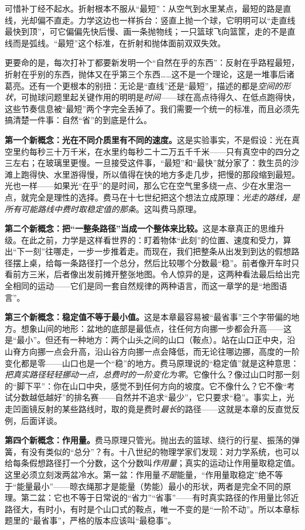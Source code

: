 可惜补丁经不起水。折射根本不服从“最短”：从空气到水里某点，最短的路是直线，光却偏不直走。力学这边也一样拆台：竖直上抛一个球，它明明可以“走直线最快到顶”，可它偏偏先快后慢、画一条抛物线；一只篮球飞向篮筐，走的不是直线而是弧线。“最短”这个标准，在折射和抛体面前双双失效。

更要命的是，每次打补丁都要新发明一个“自然在乎的东西”：反射在乎路程最短，折射在乎别的东西，抛体又在乎第三个东西……这不是一个理论，这是一堆事后诸葛亮。还有一个更根本的别扭：无论是“直线”还是“最短”，描述的都是\emph{空间的形状}，可抛球问题里起关键作用的明明是\emph{时间}——球在高点待得久、在低点跑得快，这些节奏信息被“最短”两个字完全丢掉了。我们需要一个统一的标准，而且必须先搞清楚一件事：自然“省”的到底是什么。


\begin{mainline}
\textbf{第一个新概念：光在不同介质里有不同的速度。}这是实验事实，不是假设：光在真空里约每秒三十万千米，在水里约每秒二十二万五千千米——只有真空中的四分之三左右；在玻璃里更慢。一旦接受这件事，“最短”和“最快”就分家了：救生员的沙滩上跑得快、水里游得慢，所以值得在快的地方多走几步，把慢的那段缩到最短。光也一样——如果光“在乎”的是时间，那么它在空气里多绕一点、少在水里泡一点，就完全是理性的选择。费马在十七世纪把这个想法立成原理：\emph{光走的路线，是所有可能路线中费时取稳定值的那条}。这叫费马原理。

\textbf{第二个新概念：把“一整条路径”当成一个整体来比较。}这是本章真正的思维升级。在此之前，力学是这样看世界的：盯着物体“此刻”的位置、速度和受力，算出“下一刻”往哪走，一步一步推着走。而现在，我们把整条从出发到到达的假想路径摆上桌，给每一条路径打一个总分，然后比较哪个分数最“稳”。前者像开车时只看前方三米，后者像出发前摊开整张地图。令人惊异的是，这两种看法最后给出完全相同的运动——它们是同一套自然规律的两种语言，而这一章学的是“地图语言”。

\textbf{第三个新概念：稳定值不等于最小值。}这是本章最容易被“最省事”三个字带偏的地方。想象山间的地形：盆地的底部是最低点，往任何方向挪一步都会升高——这是“最小”。但还有一种地方：两个山头之间的山口（鞍点）。站在山口正中央，沿山脊方向挪一点会升高，沿山谷方向挪一点会降低，而无论往哪边挪，高度的一阶变化都是零——山口也是一个“稳”的地方。费马原理说的“稳定值”就是这种意思：\emph{把真实路径轻轻挪动一点，总费时的一阶变化为零}。它像什么？像过山口时那一刻的“脚下平”：你在山口中央，感觉不到任何方向的坡度。它不像什么？它不像“考试分数越低越好”的排名赛——自然并不追求“最少”，它只要求“稳”。事实上，光走凹面镜反射的某些路线时，取的竟是费时\emph{最长}的路径——这就是本章的反直觉反例，后面详谈。

\textbf{第四个新概念：作用量。}费马原理只管光。抛出去的篮球、绕行的行星、振荡的弹簧，有没有类似的“总分”？有。十八世纪的物理学家们发现：对力学系统，也可以给每条假想路径打一个分数，这个分数叫\emph{作用量}；真实的运动让作用量取稳定值。这里必须立刻泼两盆冷水。第一盆：作用量\emph{不是}能量，“作用量取稳定”绝不等于“能量最小”——晾衣绳那才是能量（势能）最小的形状，两者是完全不同的原理。第二盆：它也不等于日常说的“省力”“省事”——有时真实路径的作用量比邻近路径大，有时小，有时是个山口式的鞍点，唯一不变的是“一阶不动”。所以本章标题里的“最省事”，严格的版本应该叫“最稳事”。


\end{mainline}
